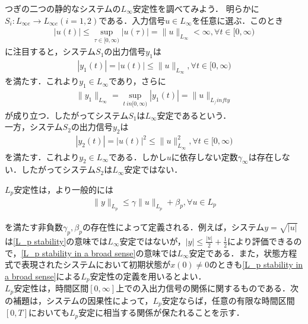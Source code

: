 \documentclass[a4paper,11pt,uplatex]{jsarticle} %
\theoremstyle{definition}	%
\begin{document}
\begin{tcolorbox}[title=例5.5,
drop small lifted shadow=black]
つぎの二つの静的なシステムの$L_\infty$安定性を調べてみよう．
明らかに$S_i : L_{\infty e} \to L_{\infty e } (i= 1,2)$である．入力信号$u \in L_\infty $を任意に選ぶ．このとき
\begin{align}
\label{eq1:example 5.5}
| u(t) | \leq \sup_{\tau \in [0, \infty) } | u(\tau ) | = \| u \|_{L_\infty} < \infty, \forall t \in [0, \infty)
\end{align}
に注目すると，システム$S_1$の出力信号$y_1$は
\begin{align}
\label{eq2:example 5.5}
| y_1 (t) | = | u(t) | \leq \| u \|_{L_\infty}, \forall t \in [0, \infty)
\end{align}
を満たす．これより$y_1 \in L_\infty $であり，さらに
\begin{align}
\label{eq3: example 5.5}
\| y_1 \|_{L_\infty} = \sup_{t \ in [0, \infty)} | y_1 (t) | = \| u \|_{L_/infty}
\end{align}
が成り立つ．したがってシステム$S_1$は$L_\infty$安定であるという．\\
一方，システム$S_2$の出力信号$y_2$は
\begin{align}
\label{eq4: example 5.5}
| y_2 (t) | = | u(t) |^2 \leq \| u \|^2_{L_\infty}, \forall t \in [0, \infty)
\end{align}
を満たす．これより$y_2 \in L_\infty $である．しかし$u$に依存しない定数$\gamma_\infty$は存在しない．したがってシステム$S_2$は$L_\infty$安定ではない．
\end{tcolorbox}



$L_p$安定性は，より一般的には
\begin{align}
\label{L_p stability in a broad sense}
\| y \|_{L_p} \leq \gamma \| u \|_{L_p} + \beta_p, \forall u \in L_p
\end{align}

を満たす非負数$\gamma_p, \beta_p$の存在性によって定義される．例えば，システム$y = \sqrt{| u |}$は\eqref{L_p stability}の意味では$L_\infty$安定ではないが，$|y| \leq \frac{|u|}{2} + \frac{1}{2}$により評価できるので，\eqref{L_p stability in a broad sense}の意味では$L_\infty$安定である．また，状態方程式で表現されたシステムにおいて初期状態が$x(0) \neq 0$のときも\eqref{L_p stability in a broad sense}による$L_p$安定性の定義を用いるとよい．\\
$L_p$安定性は，時間区間$[0, \infty]$上での入出力信号の関係に関するものである．次の補題は，システムの因果性によって，$L_p$安定ならば，任意の有限な時間区間$[0,T]$においても$L_p$安定に相当する関係が保たれることを示す．
\end{document}
